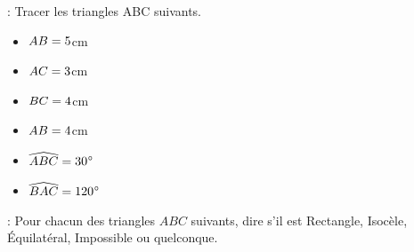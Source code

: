 

 : Tracer les triangles ABC suivants.

\begin{minipage}{0.45\textwidth}
    \begin{itemize}
        \item $AB=5$cm
        \item $AC=3$cm
        \item $BC=4$cm
    \end{itemize}
    \vspace*{10cm}
\end{minipage}
\hfil
\vrule
\hfil
\begin{minipage}{0.45\textwidth}
    \begin{itemize}
        \item $AB=4$cm
        \item $\widehat{ABC}=30$°
        \item $\widehat{BAC}=120$°
    \end{itemize}
    \vspace*{10cm}
\end{minipage}


 : Pour chacun des triangles $ABC$ suivants, dire s'il est Rectangle, Isocèle, Équilatéral, Impossible ou quelconque.

